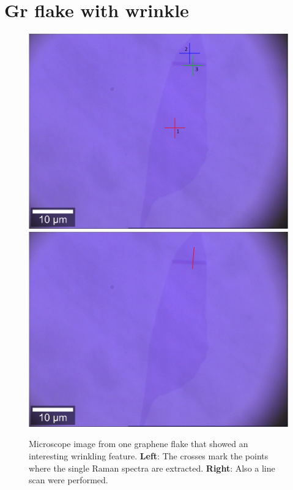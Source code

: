 \documentclass[12pt,a4paper]{article}
\begin{document}
\section{Gr flake with wrinkle}

\begin{figure}
\centering
\includegraphics[scale=0.3]{Bilder/Wrinkle/mono_single_spectra.PNG}
\includegraphics[scale=0.22]{Bilder/Wrinkle/mono_line_scan.PNG}
\caption{Microscope image from one graphene flake that showed an interesting wrinkling feature. \textbf{Left}: The crosses mark the points where the single Raman spectra are extracted. \textbf{Right}: Also a line scan were performed.}
\label{fig:wrinkle_microscope}
\end{figure}
\end{document}
